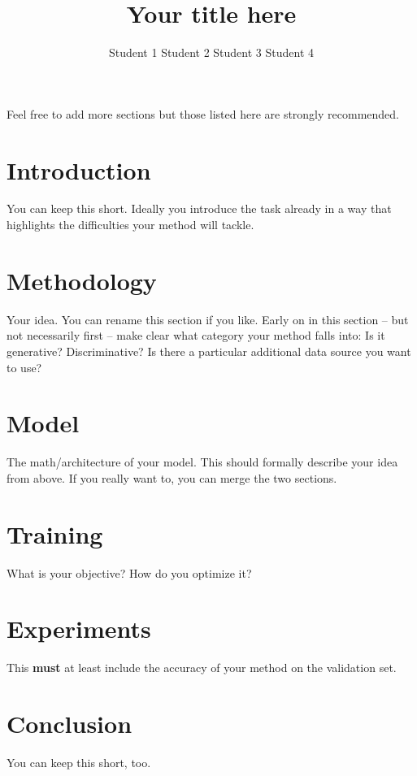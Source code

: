 \documentclass{article}
\title{Your title here}
\author{Student 1 \qquad Student 2 \qquad Student 3 \qquad Student 4}
\begin{document}

\maketitle


Feel free to add more sections but those listed here are strongly recommended.
\section{Introduction}
You can keep this short. Ideally you introduce the task already in a way that highlights the difficulties  your method will tackle.
\section{Methodology}
Your idea. You can rename this section if you like. Early on in this section -- but not necessarily first -- make clear what category your method falls into: Is it generative? Discriminative? Is there a particular additional data source you want to use?
\section{Model}
The math/architecture of your model. This should formally describe your idea from above. If you really want to, you can merge the two sections.
\section{Training}
What is your objective? How do you optimize it?

\section{Experiments}
This {\bf must} at least include the accuracy of your method on the validation set.
\section{Conclusion}
You can keep this short, too.
\end{document}
